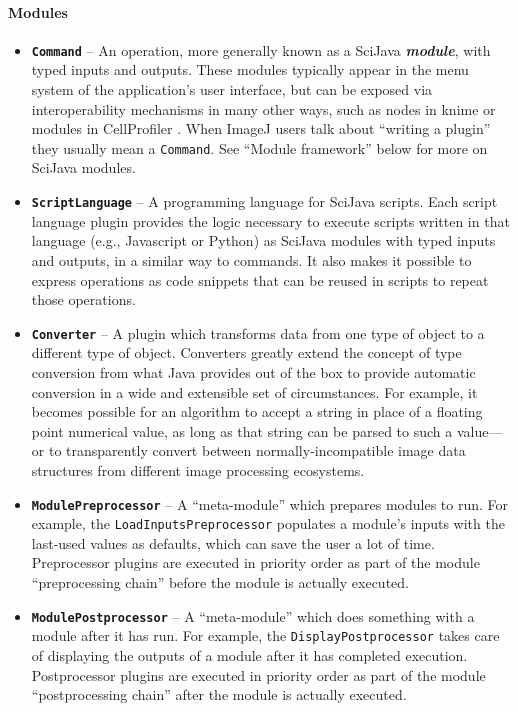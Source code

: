 \documentclass{bmcart}
\begin{document}
\paragraph*{Modules}
\begin{itemize}
  \item \textbf{\texttt{Command}} -- An operation, more generally known as a
    SciJava \textbf{\textit{module}}, with typed inputs and outputs. These
    modules typically appear in the menu system of the application's user
    interface, but can be exposed via interoperability mechanisms in many other
    ways, such as nodes in \acrshort{knime} or modules in CellProfiler
    \cite{cellprofiler}. When ImageJ users talk about ``writing a plugin'' they
    usually mean a \texttt{Command}. See ``Module framework'' below for more on
    SciJava modules.
  \item \textbf{\texttt{ScriptLanguage}} -- A programming language for SciJava
    scripts. Each script language plugin provides the logic necessary to
    execute scripts written in that language (e.g., Javascript or Python) as
    SciJava modules with typed inputs and outputs, in a similar way to
    commands. It also makes it possible to express operations as code snippets
    that can be reused in scripts to repeat those operations.
  \item \textbf{\texttt{Converter}} -- A plugin which transforms data from one
    type of object to a different type of object. Converters greatly extend the
    concept of type conversion from what Java provides out of the box to
    provide automatic conversion in a wide and extensible set of circumstances.
    For example, it becomes possible for an algorithm to accept a string in
    place of a floating point numerical value, as long as that string can be
    parsed to such a value---or to transparently convert between
    normally-incompatible image data structures from different image processing
    ecosystems.
  \item \textbf{\texttt{ModulePreprocessor}} -- A ``meta-module'' which
    prepares modules to run. For example, the \texttt{LoadInputsPreprocessor}
    populates a module's inputs with the last-used values as defaults, which
    can save the user a lot of time. Preprocessor plugins are executed in
    priority order as part of the module ``preprocessing chain'' before the
    module is actually executed.
  \item \textbf{\texttt{ModulePostprocessor}} -- A ``meta-module'' which does
    something with a module after it has run. For example, the
    \texttt{DisplayPostprocessor} takes care of displaying the outputs of a
    module after it has completed execution. Postprocessor plugins are executed
    in priority order as part of the module ``postprocessing chain'' after the
    module is actually executed.
\end{itemize}
\end{document}
